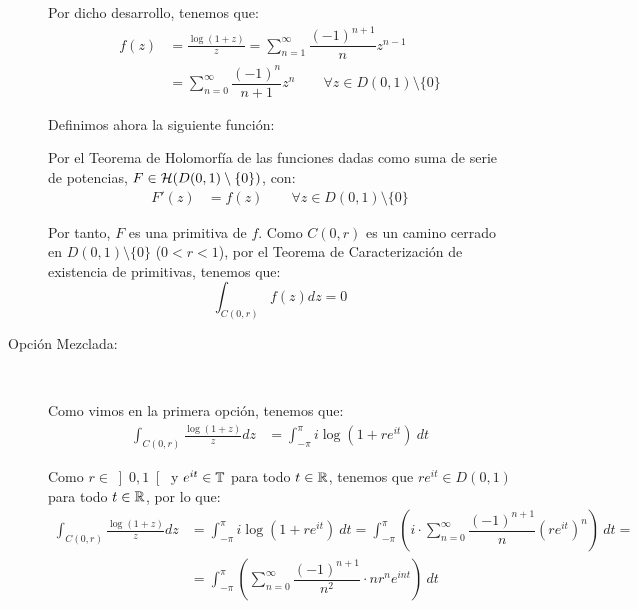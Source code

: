 \begin{ejercicio}
\begin{description}
        Por dicho desarrollo, tenemos que:
        \begin{align*}
            f(z) &= \frac{\log(1+z)}{z} = \sum\limits_{n= 1}^\infty \dfrac{(-1)^{n+1}}{n}z^{n-1}\\
            &= \sum\limits_{n=0}^\infty \dfrac{(-1)^{n}}{n+1}z^{n}\qquad \forall z \in D(0,1)\setminus \{0\}
        \end{align*}

        Definimos ahora la siguiente función:

        Por el Teorema de Holomorfía de las funciones dadas como suma de serie de potencias, $F\in \mathcal{H}(D(0,1)\setminus \{0\})$, con:
        \begin{align*}
            F'(z) &= f(z)\qquad \forall z \in D(0,1)\setminus \{0\}
        \end{align*}

        Por tanto, $F$ es una primitiva de $f$. Como $C(0,r)$ es un camino cerrado en $D(0,1)\setminus \{0\}$ ($0<r<1$), por el Teorema de Caracterización de existencia de primitivas, tenemos que:
        \begin{equation*}
            \int_{C(0,r)} f(z)dz = 0
        \end{equation*}

        \item[Opción Mezclada:]~
        
        Como vimos en la primera opción, tenemos que:
        \begin{align*}
            \int_{C(0,r)} \frac{\log(1+z)}{z}dz &= \int_{-\pi}^{\pi} i\log(1+re^{it})\ dt
        \end{align*}

        Como $r\in \left]0,1\right[$ y $e^{it} \in \mathbb{T}$ para todo $t \in \mathbb{R}$, tenemos que $re^{it} \in D(0,1)$ para todo $t \in \mathbb{R}$, por lo que:
        \begin{align*}
            \int_{C(0,r)} \frac{\log(1+z)}{z}dz &= \int_{-\pi}^{\pi} i\log(1+re^{it})\ dt = \int_{-\pi}^{\pi} \left(i\cdot\sum\limits_{n=0}^\infty \dfrac{(-1)^{n+1}}{n}(re^{it})^{n}\right)\ dt
            =\\&= \int_{-\pi}^{\pi} \left(\sum\limits_{n=0}^\infty \dfrac{(-1)^{n+1}}{n^2}\cdot nr^ne^{int}\right)\ dt
        \end{align*}


\end{description}
\end{ejercicio}

